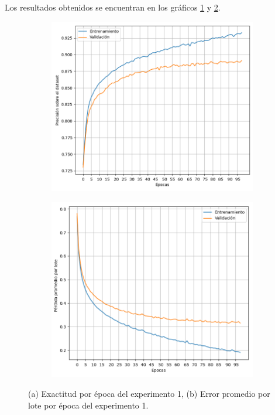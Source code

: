 \documentclass[aps,twocolumn,groupedaddress]{revtex4-2}
\begin{document}
Los resultados obtenidos se encuentran en los gráficos \ref{fig:exp1_acc} y \ref{fig:exp1_loss}.

\begin{figure}[htbp]  %
  \centering
  \begin{subfigure}[b]{0.45\textwidth}
    \centering
    \includegraphics[scale=.22]{figs/exp1/exp1_acc.png}
    \caption{}
    \label{fig:exp1_acc}
  \end{subfigure}
  \hspace{0.05\textwidth}
  \begin{subfigure}[b]{0.45\textwidth}
    \centering
    \includegraphics[scale=.22]{figs/exp1/exp1_loss.png}
    \caption{}
    \label{fig:exp1_loss}
  \end{subfigure}
  \caption{(a) Exactitud por época del experimento 1, (b) Error promedio por lote por época del experimento 1.}
  \label{fig:exp1}
\end{figure}
\end{document}
